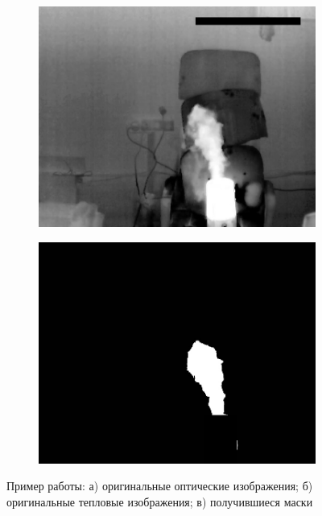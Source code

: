 \documentclass[14pt, a4paper]{extreport}
\begin{document}
\begin{figure}[h!]
\begin{subfigure}{.32\textwidth}
			\includegraphics[width = \textwidth]{image/chapter_3/examples/tep/240}
			\caption{}
		\end{subfigure}
		\hspace{0.1cm}
		\begin{subfigure}{.32\textwidth}
			\centering
			\includegraphics[width = \textwidth]{image/chapter_3/examples/mask/240}
			\caption{}
		\end{subfigure}
		\caption{Пример работы: а) оригинальные оптические изображения; б) оригинальные тепловые изображения; в) получившиеся маски}
		\label{fig:test_segm}
	\end{figure}
\end{document}

